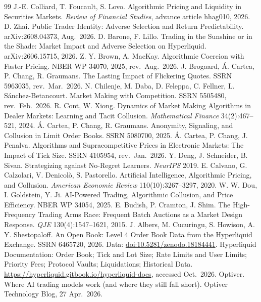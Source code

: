 \documentclass[11pt]{article}
\begin{document}
\begin{thebibliography}{99}\small
{} J.-E. Colliard, T. Foucault, S. Lovo. Algorithmic Pricing and Liquidity in Securities Markets. \emph{Review of Financial Studies}, advance article hhag010, 2026.
 D. Zhai. Public Trader Identity: Adverse Selection and Return Predictability. arXiv:2608.04373, Aug.\ 2026.
 D. Barone, F. Lillo. Trading in the Sunshine or in the Shade: Market Impact and Adverse Selection on Hyperliquid. arXiv:2606.15715, 2026.
 Z. Y. Brown, A. MacKay. Algorithmic Coercion with Faster Pricing. NBER WP 34070, 2025, rev.\ Aug.\ 2026.
 J. Brogaard, \'A. Cartea, P. Chang, R. Graumans. The Lasting Impact of Flickering Quotes. SSRN 5963035, rev.\ Mar.\ 2026.
 N. Chilenje, M. Daba, D. Feleppa, C. Fellner, L. S\'anchez-Betancourt. Market Making with Competition. SSRN 5505480, rev.\ Feb.\ 2026.
 R. Cont, W. Xiong. Dynamics of Market Making Algorithms in Dealer Markets: Learning and Tacit Collusion. \emph{Mathematical Finance} 34(2):467--521, 2024.
 \'A. Cartea, P. Chang, R. Graumans. Anonymity, Signaling, and Collusion in Limit Order Books. SSRN 5080700, 2025.
 \'A. Cartea, P. Chang, J. Penalva. Algorithms and Supracompetitive Prices in Electronic Markets: The Impact of Tick Size. SSRN 4105954, rev.\ Jan.\ 2026.
 Y. Deng, J. Schneider, B. Sivan. Strategizing against No-Regret Learners. \emph{NeurIPS} 2019.
 E. Calvano, G. Calzolari, V. Denicol\`o, S. Pastorello. Artificial Intelligence, Algorithmic Pricing, and Collusion. \emph{American Economic Review} 110(10):3267--3297, 2020.
 W. W. Dou, I. Goldstein, Y. Ji. AI-Powered Trading, Algorithmic Collusion, and Price Efficiency. NBER WP 34054, 2025.
 E. Budish, P. Cramton, J. Shim. The High-Frequency Trading Arms Race: Frequent Batch Auctions as a Market Design Response. \emph{QJE} 130(4):1547--1621, 2015.
 J. Albers, M. Cucuringu, S. Howison, A. Y. Shestopaloff. An Open Book: Level 4 Order Book Data from the Hyperliquid Exchange. SSRN 6465720, 2026. Data: \href{https://doi.org/10.5281/zenodo.18184441}{doi:10.5281/zenodo.18184441}.
 Hyperliquid Documentation: Order Book; Tick and Lot Size; Rate Limits and User Limits; Priority Fees; Protocol Vaults; Liquidations; Historical Data. \url{https://hyperliquid.gitbook.io/hyperliquid-docs}, accessed Oct.\ 2026.
 Optiver. Where AI trading models work (and where they still fall short). Optiver Technology Blog, 27 Apr.\ 2026.
\end{thebibliography}
\end{document}
